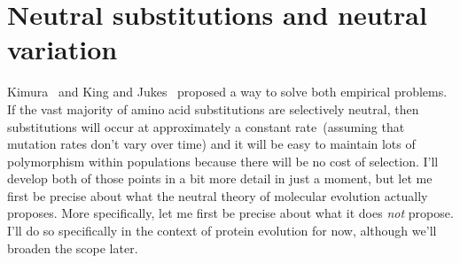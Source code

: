 \section*{Neutral substitutions and neutral variation}

Kimura~\cite{Kimura68} and King and Jukes~\cite{King-Jukes69} proposed
a way to solve both empirical problems. If the vast majority of amino
acid substitutions are selectively neutral, then substitutions will
occur at approximately a constant rate~(assuming that mutation rates
don't vary over time) and it will be easy to maintain lots of
polymorphism within populations because there will be no cost of
selection. I'll develop both of those points in a bit more detail in
just a moment, but let me first be precise about what the neutral
theory of molecular evolution actually proposes. More specifically,
let me first be precise about what it does {\it not\/} propose. I'll
do so specifically in the context of protein evolution for now,
although we'll broaden the scope later.

